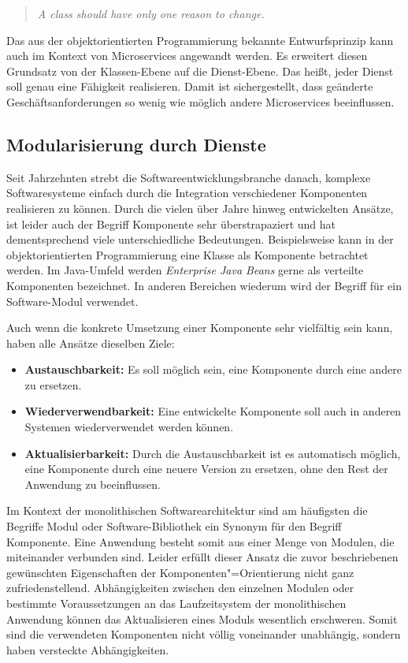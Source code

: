\begin{english}
\begin{quote}
  \textit{A class should have only one reason to change.}
\end{quote}
\end{english}

Das aus der objektorientierten Programmierung bekannte Entwurfsprinzip kann auch im Kontext von Microservices angewandt werden. Es erweitert diesen Grundsatz von der Klassen-Ebene auf die Dienst-Ebene. Das heißt, jeder Dienst soll genau eine Fähigkeit realisieren. Damit ist sichergestellt, dass geänderte Geschäftsanforderungen so wenig wie möglich andere Microservices beeinflussen.

\subsection{Modularisierung durch Dienste}
\label{subsec:Componentization}

Seit Jahrzehnten strebt die Softwareentwicklungsbranche danach, komplexe Softwaresysteme einfach durch die Integration verschiedener Komponenten realisieren zu können. Durch die vielen über Jahre hinweg entwickelten Ansätze, ist leider auch der Begriff Komponente sehr überstrapaziert und hat dementsprechend viele unterschiedliche Bedeutungen. Beispielsweise kann in der objektorientierten Programmierung eine Klasse als Komponente betrachtet werden. Im Java-Umfeld werden \textit{Enterprise Java Beans} gerne als verteilte Komponenten bezeichnet. In anderen Bereichen wiederum wird der Begriff für ein Software-Modul verwendet.

Auch wenn die konkrete Umsetzung einer Komponente sehr vielfältig sein kann, haben alle Ansätze dieselben Ziele:

\begin{itemize}
	\item \textbf{Austauschbarkeit:} Es soll möglich sein, eine Komponente durch eine andere zu ersetzen. 
	\item \textbf{Wiederverwendbarkeit:} Eine entwickelte Komponente soll auch in anderen Systemen wiederverwendet werden können.
	\item \textbf{Aktualisierbarkeit:} Durch die Austauschbarkeit ist es automatisch möglich, eine Komponente durch eine neuere Version zu ersetzen, ohne den Rest der Anwendung zu beeinflussen.
\end{itemize}

Im Kontext der monolithischen Softwarearchitektur sind am häufigsten die Begriffe Modul oder Software-Bibliothek ein Synonym für den Begriff Komponente. Eine Anwendung besteht somit aus einer Menge von Modulen, die miteinander verbunden sind. Leider erfüllt dieser Ansatz die zuvor beschriebenen gewünschten Eigenschaften der Komponenten"=Orientierung nicht ganz zufriedenstellend. Abhängigkeiten zwischen den einzelnen Modulen oder bestimmte Voraussetzungen an das Laufzeitsystem der monolithischen Anwendung können das Aktualisieren eines Moduls wesentlich erschweren. Somit sind die verwendeten Komponenten nicht völlig voneinander unabhängig, sondern haben versteckte Abhängigkeiten.

